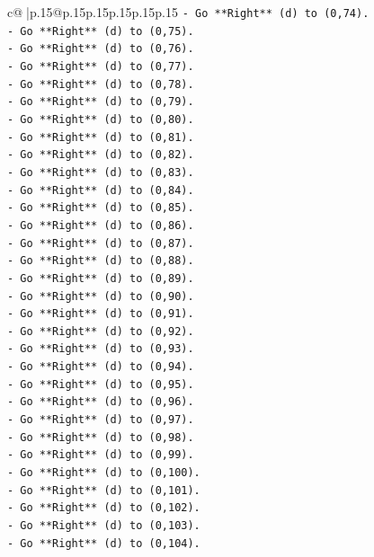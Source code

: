 \documentclass{article}
\begin{document}
{\begin{supertabular}{c@{$\;$}|p{.15\linewidth}@{}p{.15\linewidth}p{.15\linewidth}p{.15\linewidth}p{.15\linewidth}p{.15\linewidth}}
{{{\texttt{{-} Go **Right** (d) to (0,74).} \\
\texttt{{-} Go **Right** (d) to (0,75).} \\
\texttt{{-} Go **Right** (d) to (0,76).} \\
\texttt{{-} Go **Right** (d) to (0,77).} \\
\texttt{{-} Go **Right** (d) to (0,78).} \\
\texttt{{-} Go **Right** (d) to (0,79).} \\
\texttt{{-} Go **Right** (d) to (0,80).} \\
\texttt{{-} Go **Right** (d) to (0,81).} \\
\texttt{{-} Go **Right** (d) to (0,82).} \\
\texttt{{-} Go **Right** (d) to (0,83).} \\
\texttt{{-} Go **Right** (d) to (0,84).} \\
\texttt{{-} Go **Right** (d) to (0,85).} \\
\texttt{{-} Go **Right** (d) to (0,86).} \\
\texttt{{-} Go **Right** (d) to (0,87).} \\
\texttt{{-} Go **Right** (d) to (0,88).} \\
\texttt{{-} Go **Right** (d) to (0,89).} \\
\texttt{{-} Go **Right** (d) to (0,90).} \\
\texttt{{-} Go **Right** (d) to (0,91).} \\
\texttt{{-} Go **Right** (d) to (0,92).} \\
\texttt{{-} Go **Right** (d) to (0,93).} \\
\texttt{{-} Go **Right** (d) to (0,94).} \\
\texttt{{-} Go **Right** (d) to (0,95).} \\
\texttt{{-} Go **Right** (d) to (0,96).} \\
\texttt{{-} Go **Right** (d) to (0,97).} \\
\texttt{{-} Go **Right** (d) to (0,98).} \\
\texttt{{-} Go **Right** (d) to (0,99).} \\
\texttt{{-} Go **Right** (d) to (0,100).} \\
\texttt{{-} Go **Right** (d) to (0,101).} \\
\texttt{{-} Go **Right** (d) to (0,102).} \\
\texttt{{-} Go **Right** (d) to (0,103).} \\
\texttt{{-} Go **Right** (d) to (0,104).} \\
}}}
\end{supertabular}}
\end{document}
